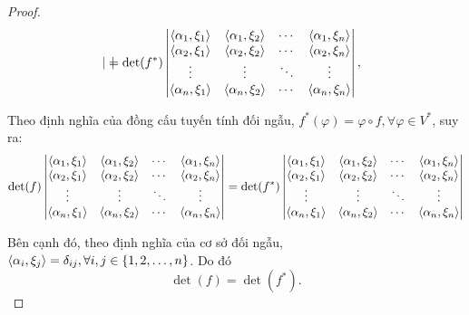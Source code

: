 \documentclass[class=linear-algebra,crop=false]{standalone}
\begin{document}
\begin{proof}
\begin{align*}
\begin{vmatrix}
		\end{vmatrix}
		 & = \det(f^{*})
		\begin{vmatrix}
			\left\langle{\alpha_{1},\xi_{1}}\right\rangle & \left\langle{\alpha_{1},\xi_{2}}\right\rangle & \cdots & \left\langle{\alpha_{1},\xi_{n}}\right\rangle \\
			\left\langle{\alpha_{2},\xi_{1}}\right\rangle & \left\langle{\alpha_{2},\xi_{2}}\right\rangle & \cdots & \left\langle{\alpha_{2},\xi_{n}}\right\rangle \\
			\vdots                       & \vdots                       & \ddots & \vdots                       \\
			\left\langle{\alpha_{n},\xi_{1}}\right\rangle & \left\langle{\alpha_{n},\xi_{2}}\right\rangle & \cdots & \left\langle{\alpha_{n},\xi_{n}}\right\rangle \\
		\end{vmatrix}, \\
	\end{align*}
	\par Theo định nghĩa của đồng cấu tuyến tính đối ngẫu, $f^{*}(\varphi) = \varphi\circ f, \forall\varphi\in V^{*}$, suy ra:
	\[
		\det(f)
		\begin{vmatrix}
			\left\langle{\alpha_{1},\xi_{1}}\right\rangle & \left\langle{\alpha_{1},\xi_{2}}\right\rangle & \cdots & \left\langle{\alpha_{1},\xi_{n}}\right\rangle \\
			\left\langle{\alpha_{2},\xi_{1}}\right\rangle & \left\langle{\alpha_{2},\xi_{2}}\right\rangle & \cdots & \left\langle{\alpha_{2},\xi_{n}}\right\rangle \\
			\vdots                       & \vdots                       & \ddots & \vdots                       \\
			\left\langle{\alpha_{n},\xi_{1}}\right\rangle & \left\langle{\alpha_{n},\xi_{2}}\right\rangle & \cdots & \left\langle{\alpha_{n},\xi_{n}}\right\rangle \\
		\end{vmatrix}
		=
		\det(f^{*})
		\begin{vmatrix}
			\left\langle{\alpha_{1},\xi_{1}}\right\rangle & \left\langle{\alpha_{1},\xi_{2}}\right\rangle & \cdots & \left\langle{\alpha_{1},\xi_{n}}\right\rangle \\
			\left\langle{\alpha_{2},\xi_{1}}\right\rangle & \left\langle{\alpha_{2},\xi_{2}}\right\rangle & \cdots & \left\langle{\alpha_{2},\xi_{n}}\right\rangle \\
			\vdots                       & \vdots                       & \ddots & \vdots                       \\
			\left\langle{\alpha_{n},\xi_{1}}\right\rangle & \left\langle{\alpha_{n},\xi_{2}}\right\rangle & \cdots & \left\langle{\alpha_{n},\xi_{n}}\right\rangle \\
		\end{vmatrix}
	\]
	\par Bên cạnh đó, theo định nghĩa của cơ sở đối ngẫu, $\left\langle{\alpha_{i}, \xi_{j}}\right\rangle = \delta_{ij}, \forall i, j\in \{ 1, 2, \ldots, n \}$. Do đó
	\[
		\det(f) = \det(f^{*}).
	\]
	\endgroup{}
\end{proof}
\end{document}
